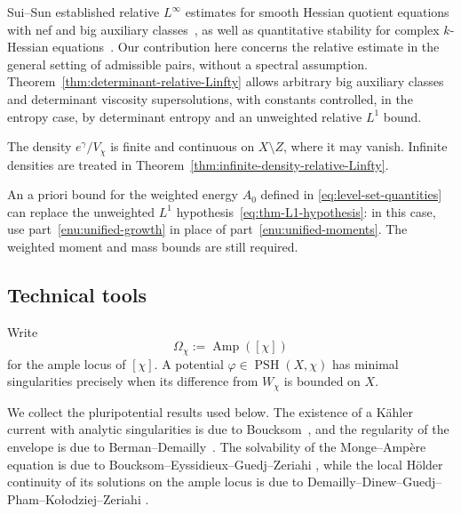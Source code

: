 \documentclass[oneside,english,letterpaper]{amsart}
\numberwithin{equation}{section}
\theoremstyle{plain}
\theoremstyle{definition}
\theoremstyle{remark}
\begin{document}
Sui--Sun established relative $L^\infty$ estimates for smooth
Hessian quotient equations with nef and big auxiliary
classes~\cite[Theorem~1.2]{MR4567566}, as well as quantitative
stability for complex $k$-Hessian
equations~\cite[Theorem~1.5]{MR4567566}.
Our contribution here concerns the relative estimate in the
general setting of admissible pairs, without a spectral
assumption. Theorem~\ref{thm:determinant-relative-Linfty}
allows arbitrary big auxiliary classes and determinant
viscosity supersolutions, with constants controlled, in the
entropy case, by determinant entropy and an unweighted
relative $L^1$ bound.

The density $e^\gamma/V_\chi$ is finite and continuous on
$X\setminus Z$, where it may vanish. Infinite densities are
treated in Theorem~\ref{thm:infinite-density-relative-Linfty}.

An a priori bound for the weighted energy $A_0$ defined in
\eqref{eq:level-set-quantities} can replace the unweighted
$L^1$ hypothesis~\eqref{eq:thm-L1-hypothesis}: in this case,
use part~\ref{enu:unified-growth} in place of
part~\ref{enu:unified-moments}. The weighted moment and mass
bounds are still required.

\subsection{Technical tools}
\label{subsec:big-class-scalar-estimate}

Write
\[
\Omega_\chi:=\operatorname{Amp}([\chi])
\]
for the ample locus of $[\chi]$. A potential
$\varphi\in\operatorname{PSH}(X,\chi)$ has minimal singularities
precisely when its difference from $W_\chi$ is bounded on $X$.

We collect the pluripotential results used below. The existence
of a K\"ahler current with analytic singularities is due to
Boucksom~\cite[Theorem~3.17]{MR2050205}, and the regularity of
the envelope is due to
Berman--Demailly~\cite[Theorem~1.4]{MR2884031}.
The solvability of the Monge--Amp\`ere equation is due to
Boucksom--Eyssidieux--Guedj--Zeriahi
\cite[Theorems~A and B]{MR2746347}, while the local H\"older
continuity of its solutions on the ample locus is due to
Demailly--Dinew--Guedj--Pham--Ko\l odziej--Zeriahi
\cite[Theorem~D]{MR3191972}.
\end{document}
